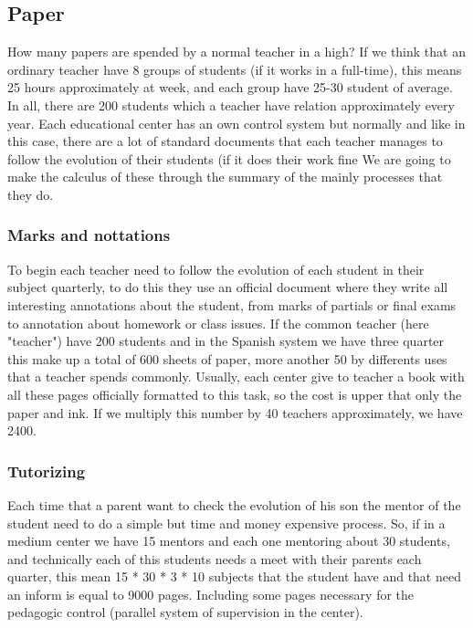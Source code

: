 \subsection{Paper}
How many papers are spended by a normal teacher in a high?
\intro
If we think that an ordinary teacher have 8 groups of students (if it works in a
full-time), this means 25 hours approximately at week, and each group have
25-30 student of average. In all, there are 200 students which a teacher have
relation approximately every year.
\intro
Each educational center has an own control system but normally and like in this case,
there are a lot of standard documents that each teacher manages to follow
the evolution of their students (if it does their work fine
\intro
We are going to make the calculus of these through the summary of the mainly
processes that they do.

\subsubsection{Marks and nottations}

To begin each teacher need to follow the evolution of each student in their
subject quarterly, to do this they use an official document where they write
all interesting annotations about the student, from marks of partials or final
exams to annotation about homework or class issues.
\intro
If the common teacher (here "teacher") have 200 students and in the Spanish
system we have three quarter this make up a total of 600 sheets of paper,
more another 50 by differents uses that a teacher spends commonly.
Usually, each center give to teacher a book with all these pages officially
formatted to this task, so the cost is upper that only the paper and ink.
If we multiply this number by 40 teachers approximately, we have 2400.

\subsubsection{Tutorizing}
Each time that a parent want to check the evolution of his son the mentor
of the student need to do a simple but time and money expensive process.
\intro
So, if in a medium center we have 15 mentors and each one mentoring about
30 students, and technically each of this students needs a meet with their
parents each quarter, this mean 15 * 30 * 3 * 10 subjects that the student have
 and that need an inform is equal to 9000 pages.
Including some pages necessary for the pedagogic control (parallel system of
supervision in the center).

